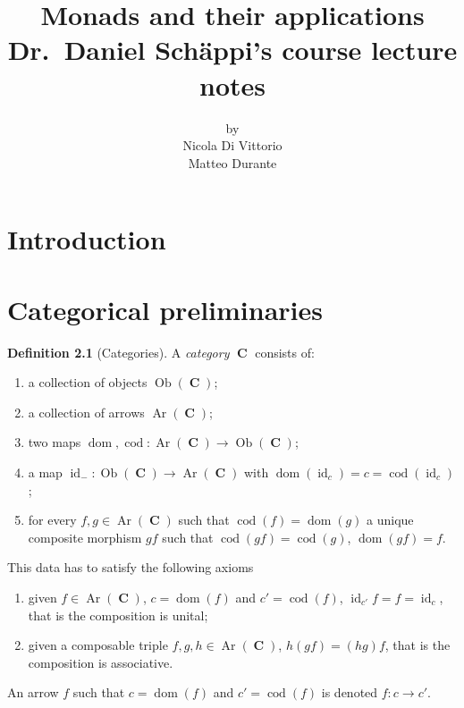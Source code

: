 \documentclass[a4paper,11pt,twoside, openany]{book}
\DeclareMathOperator{\C}{\mathbf{C}}
\DeclareMathOperator{\id}{id}
\DeclareMathOperator{\dom}{dom}
\DeclareMathOperator{\cod}{cod}
\DeclareMathOperator{\Ob}{Ob}
\DeclareMathOperator{\Ar}{Ar}
\theoremstyle{definition}
\theoremstyle{definition}
\newtheorem{defn}[thm]{Definition} %
\theoremstyle{remark}
\begin{document}
\author{by \\
	Nicola Di Vittorio \\ Matteo Durante}
\title{\Huge Monads and their applications \\
	\vspace*{5mm}
	\Large Dr.\ Daniel Schäppi's course lecture notes} 
\date{}

	
	\frontmatter
	\maketitle
	\thispagestyle{empty}\doclicenseThis
	\tableofcontents
	
	\chapter{Introduction}
	
	\mainmatter
	
	\chapter{Categorical preliminaries}
	\begin{defn}[Categories]
		A \emph{category} $\C$ consists of:
		\begin{enumerate}
			\item a collection of objects $\Ob(\C)$;
			\item a collection of arrows $\Ar(\C)$;
			\item two maps $\dom,\cod\colon\Ar(\C)\rightarrow\Ob(\C)$;
			\item a map $\id_{-}\colon\Ob(\C)\rightarrow\Ar(\C)$ with $\dom(\id_{c})=c=\cod(\id_{c})$;
			\item for every $f,g\in\Ar(\C)$ such that $\cod(f)=\dom(g)$ a unique composite morphism $gf$ such that $\cod(gf)=\cod(g)$, $\dom(gf)=f$.
		\end{enumerate}
		This data has to satisfy the following axioms
		\begin{enumerate}
			\item given $f\in\Ar(\C)$, $c=\dom(f)$ and $c'=\cod(f)$, $\id_{c'}f=f=\id_{c}$, that is the composition is unital;
			\item given a composable triple $f,g,h\in\Ar(\C)$, $h(gf)=(hg)f$, that is the composition is associative.
		\end{enumerate}
		An arrow $f$ such that $c=\dom(f)$ and $c'=\cod(f)$ is denoted $f\colon c\rightarrow c'$.
	\end{defn}
	
\end{document}
